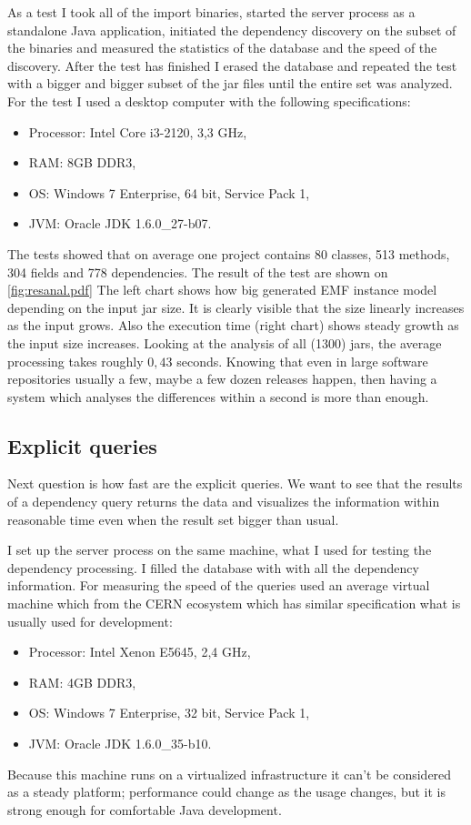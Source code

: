 As a test I took all of the import binaries, started the server process as a
standalone Java application, initiated the dependency discovery on the subset of
the binaries and measured the statistics of the database and the speed of the
discovery. After the test has finished I erased the database and repeated the
test with a bigger and bigger subset of the jar files until the entire set was
analyzed. For the test I used a desktop computer with the following
specifications:
\begin{itemize}
  \item Processor: Intel Core i3-2120, 3,3 GHz,
  \item RAM: 8GB DDR3,
  \item OS: Windows 7 Enterprise, 64 bit, Service Pack 1,
  \item JVM: Oracle JDK 1.6.0\_27-b07.
\end{itemize}
The tests showed that on average one project contains 80 classes, 513 methods, 304 fields and 778 dependencies. 
The result of the test are shown on \autoref{fig:resanal.pdf}
The left chart shows how big generated EMF instance model depending on the
input jar size. It is clearly visible that the size linearly increases
as the input grows. Also the execution time (right chart) shows 
steady growth as the input size increases. Looking at the analysis
 of all (1300) jars, the average processing takes roughly $0,43$ seconds.
Knowing that even in large software repositories usually a few, maybe a few 
dozen releases happen, then having a system which analyses the differences within
a second is more than enough.

\subsection{Explicit queries}
Next question is how fast are the explicit queries. We want to see that the
results of a dependency query returns the data and visualizes the information
within reasonable time even when the result set bigger than usual. 

I set up the server process on the same machine, what I used for 
testing the dependency processing. I filled the database with with all the
dependency information. For measuring the speed of the queries used an average
virtual machine which from the CERN ecosystem which has similar specification
what is usually used for development:
\begin{itemize}
  \item Processor: Intel Xenon E5645, 2,4 GHz,
  \item RAM: 4GB DDR3,
  \item OS: Windows 7 Enterprise, 32 bit, Service Pack 1,
  \item JVM: Oracle JDK 1.6.0\_35-b10.
\end{itemize}
Because this machine runs on a virtualized infrastructure it can't be
considered as a steady platform; performance could change as the usage changes,
but it is strong enough for comfortable Java development. 

